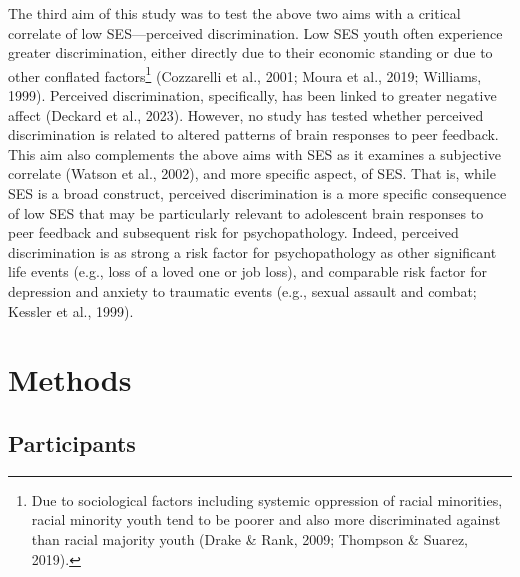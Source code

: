 \documentclass[
  man]{apa7}
\begin{document}
The third aim of this study was to test the above two aims with a critical correlate of low SES---perceived discrimination. Low SES youth often experience greater discrimination, either directly due to their economic standing or due to other conflated factors\footnote{Due to sociological factors including systemic oppression of racial minorities, racial minority youth tend to be poorer and also more discriminated against than racial majority youth (Drake \& Rank, 2009; Thompson \& Suarez, 2019).} (Cozzarelli et al., 2001; Moura et al., 2019; Williams, 1999). Perceived discrimination, specifically, has been linked to greater negative affect (Deckard et al., 2023). However, no study has tested whether perceived discrimination is related to altered patterns of brain responses to peer feedback. This aim also complements the above aims with SES as it examines a subjective correlate (Watson et al., 2002), and more specific aspect, of SES. That is, while SES is a broad construct, perceived discrimination is a more specific consequence of low SES that may be particularly relevant to adolescent brain responses to peer feedback and subsequent risk for psychopathology. Indeed, perceived discrimination is as strong a risk factor for psychopathology as other significant life events (e.g., loss of a loved one or job loss), and comparable risk factor for depression and anxiety to traumatic events (e.g., sexual assault and combat; Kessler et al., 1999).

\hypertarget{methods}{%
\section{Methods}\label{methods}}

\hypertarget{participants}{%
\subsection{Participants}\label{participants}}
\end{document}
